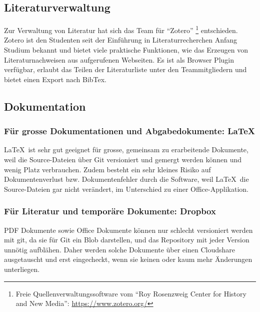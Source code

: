 				
		\subsection{Literaturverwaltung}
			Zur Verwaltung von Literatur hat sich das Team für "`Zotero"' \footnote{Freie Quellenverwaltungssoftware vom "`Roy Rosenzweig Center for History and New Media"': \url{https://www.zotero.org/}} entschieden.
			Zotero ist den Studenten seit der Einführung in Literaturrecherchen Anfang Studium bekannt und
			bietet viele praktische Funktionen, wie das Erzeugen von Literaturnachweisen aus aufgerufenen Webseiten.
			Es ist als Browser Plugin verfügbar, erlaubt das Teilen der Literaturliste unter den Teammitgliedern und bietet einen Export nach BibTex.
			

		\subsection{Dokumentation}
			\subsubsection{Für grosse Dokumentationen und Abgabedokumente: \LaTeX}
				\LaTeX\ ist sehr gut geeignet für grosse, gemeinsam zu erarbeitende Dokumente,
				weil die Source-Dateien über Git versioniert und gemergt werden können und wenig
				Platz verbrauchen. 
				Zudem besteht ein sehr kleines Risiko auf Dokumentenverlust
				bzw. Dokumentenfehler durch die Software, weil \LaTeX\ die Source-Dateien gar
				nicht verändert, im Unterschied zu einer Office-Applikation.
				
			\subsubsection{Für Literatur und temporäre Dokumente: Dropbox}
			PDF Dokumente sowie Office Dokumente können nur schlecht versioniert werden mit git, 
			da sie für Git ein Blob darstellen, und das Repository mit jeder Version unnötig aufblähen.
			Daher werden solche Dokumente über einen Cloudshare ausgetauscht und erst eingecheckt, 
			wenn sie keinen oder kaum mehr Änderungen unterliegen.
				

